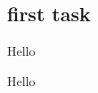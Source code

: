 
\subsection{first task}

\begin{tcolorbox}[title=Task1]
    \begin{center}
        Hello
    \end{center}
\end{tcolorbox}



\begin{center}
    Hello

\end{center}

